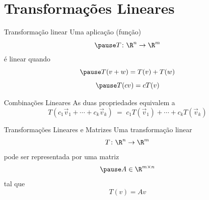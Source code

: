 \documentclass[fleqn,aspectratio=169,12pt]{beamer}
\begin{document}
\section{Transformações Lineares}

\begin{frame}{Transformação linear}
  Uma aplicação (função)
  \[
    \pause
    T\colon \R^n \to \R^m
  \]
  \pause
  é linear quando
  \[
    \pause
    T(v+w) = T(v) + T(w)
  \]
  \[
    \pause
    T(cv) = cT(v)
  \]
\end{frame}

\begin{frame}{Combinações Lineares}
  As duas propriedades equivalem a
  \[
    T\left( c_1\vec{v}_1 + \cdots + c_k\vec{v}_k \right)
    \;=\; c_1 T(\vec{v}_1) + \cdots + c_kT(\vec{v}_k)
  \]
\end{frame}





\begin{frame}{Transformações Lineares e Matrizes}
  Uma transformação linear
  \[
    T\colon \R^n \to \R^m
  \]
  \pause
  pode ser representada por uma matriz
  \[
    \pause
    A \in \R^{m\times n}
  \]
  \pause
  tal que
  \[
    T(v) = A v
  \]
\end{frame}



%
%

\end{document}
